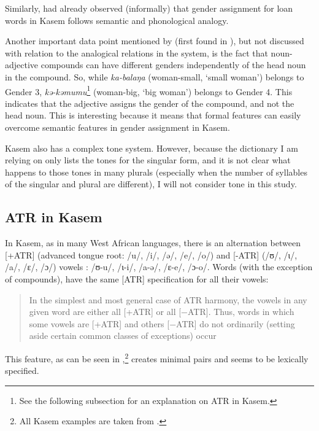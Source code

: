 Similarly, \textcite[250]{Awedoba.1980} had already observed (informally) that gender assignment for loan words in Kasem follows semantic and phonological analogy.

Another important data point mentioned by \textcite[13]{Awedoba.2003} (first found in \cite{Awedoba.1996}), but not discussed with relation to the analogical relations in the system, is the fact that noun-adjective compounds can have different genders independently of the head noun in the compound. So, while \textit{ka-balaŋa} (woman-small, `small woman') belongs to Gender 3, \textit{kə-kəmumu}\footnote{See the following subsection for an explanation on ATR in Kasem.} (woman-big, `big wo\-man') belongs to Gender 4. This indicates that the adjective assigns the gender of the compound, and not the head noun. This is interesting because it means that formal features can easily overcome semantic features in gender assignment in Kasem.

Kasem also has a complex tone system. However, because the dictionary I am relying on \autocite{Niggli.2016} only lists the tones for the singular form, and it is not clear what happens to those tones in many plurals (especially when the number of syllables of the singular and plural are different), I will not consider tone in this study.

\subsection{ATR in Kasem}

In Kasem, as in many West African languages, there is an alternation between [+ATR] (advanced tongue root: /u/, /i/, /ə/, /e/, /o/) and [-ATR] (/ʊ/, /ɩ/, /a/, /ɛ/, /ɔ/) vowels \autocite{Casali.2008}: /ʊ-u/, /ɩ-i/, /a-ə/, /ɛ-e/, /ɔ-o/. Words (with the exception of compounds), have the same [ATR] specification for all their vowels:

\begin{quotation}
In the simplest and most general case of ATR harmony, the vowels in any given word are either all [+ATR] or all [−ATR]. Thus, words in which some vowels are [+ATR] and others [−ATR] do not ordinarily (setting aside certain common classes of exceptions) occur \autocite[496]{Casali.2008}
\end{quotation}

This feature, as can be seen in ,\footnote{All Kasem examples are taken from \textcite{Niggli.2016}.} creates minimal pairs and seems to be lexically specified.

